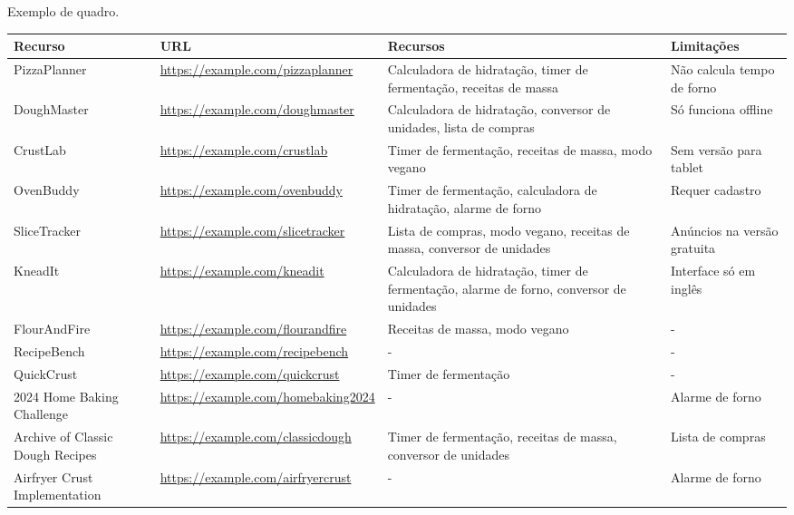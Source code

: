 \begin{landscape}
\begin{quadro}[!htp]
\centering
\caption{Exemplo de quadro.}
\label{quad:quadro1}
\scriptsize

\begin{tabular}{|p{2.5cm}|p{5cm}|p{8cm}|p{6cm}|}
\hline
\textbf{Recurso} & \textbf{URL} & \textbf{Recursos} & \textbf{Limitações} \\
\hline
PizzaPlanner & \url{https://example.com/pizzaplanner} & Calculadora de hidratação, timer de fermentação, receitas de massa & Não calcula tempo de forno \\
\hline
DoughMaster & \url{https://example.com/doughmaster} & Calculadora de hidratação, conversor de unidades, lista de compras & Só funciona offline \\
\hline
CrustLab & \url{https://example.com/crustlab} & Timer de fermentação, receitas de massa, modo vegano & Sem versão para tablet \\
\hline
OvenBuddy & \url{https://example.com/ovenbuddy} & Timer de fermentação, calculadora de hidratação, alarme de forno & Requer cadastro \\
\hline
SliceTracker & \url{https://example.com/slicetracker} & Lista de compras, modo vegano, receitas de massa, conversor de unidades & Anúncios na versão gratuita \\
\hline
KneadIt & \url{https://example.com/kneadit} & Calculadora de hidratação, timer de fermentação, alarme de forno, conversor de unidades & Interface só em inglês \\
\hline
FlourAndFire & \url{https://example.com/flourandfire} & Receitas de massa, modo vegano & - \\
\hline
RecipeBench & \url{https://example.com/recipebench} & - & - \\
\hline
QuickCrust & \url{https://example.com/quickcrust} & Timer de fermentação & - \\
\hline
2024 Home Baking Challenge & \url{https://example.com/homebaking2024} & - & Alarme de forno \\
\hline
Archive of Classic Dough Recipes & \url{https://example.com/classicdough} & Timer de fermentação, receitas de massa, conversor de unidades & Lista de compras \\
\hline
Airfryer Crust Implementation & \url{https://example.com/airfryercrust} & - & Alarme de forno \\
\hline
\end{tabular}

\fonteautor
\end{quadro}
\end{landscape}
